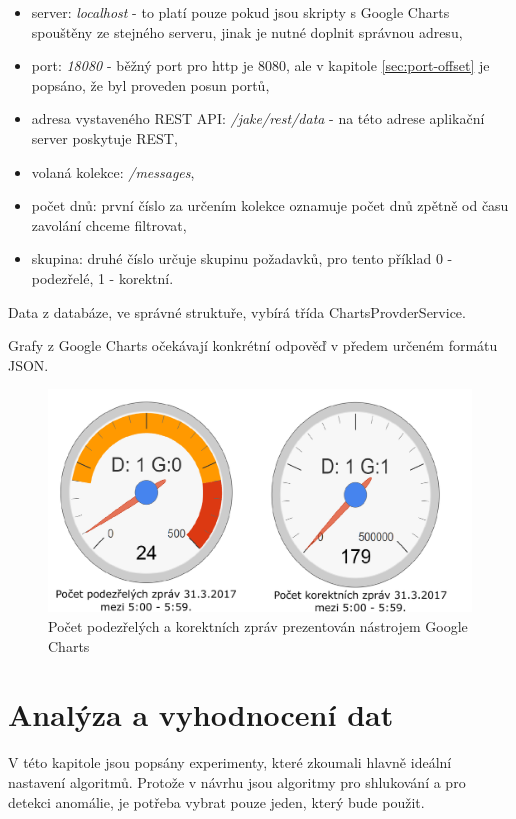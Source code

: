 \documentclass[thesis=M,czech]{FITthesis}[2012/10/20]
\newcommand{\tmpframe}[1]{\fbox{#1}}
\renewcommand{\tmpframe}[1]{#1}
\begin{document}
		\begin{itemize} 
			\item server: \textit{localhost} - to platí pouze pokud jsou skripty s Google Charts spouštěny ze stejného serveru, jinak je nutné doplnit správnou adresu,
			\item port: \textit{18080} - běžný port pro http je 8080, ale v kapitole \ref{sec:port-offset} je popsáno, že byl proveden posun portů,
			\item adresa vystaveného REST API: \textit{/jake/rest/data} - na této adrese aplikační server poskytuje REST,
			\item volaná kolekce: \textit{/messages},
			\item počet dnů: první číslo za určením kolekce oznamuje počet dnů zpětně od času zavolání chceme filtrovat,
			\item skupina: druhé číslo určuje skupinu požadavků, pro tento příklad 0 - podezřelé, 1 - korektní.
		\end{itemize}
		
		  
		
		Data z databáze, ve správné struktuře, vybírá třída ChartsProvderService.
		
		Grafy z Google Charts očekávají konkrétní odpověď v předem určeném formátu JSON.
		
		\begin{figure}[htb]\centering
			\tmpframe{\includegraphics[width=\textwidth]{./img/gCharts}}	
			\caption{Počet podezřelých a korektních zpráv prezentován nástrojem Google Charts}
			\label{fig:gCharts}
		\end{figure}

\chapter{Analýza a vyhodnocení dat}
	\label{chap:analyse}
	V této kapitole jsou popsány experimenty, které zkoumali hlavně ideální nastavení algoritmů. Protože v návrhu jsou algoritmy pro shlukování a pro detekci anomálie, je potřeba vybrat pouze jeden, který bude použit.
	
\end{document}
